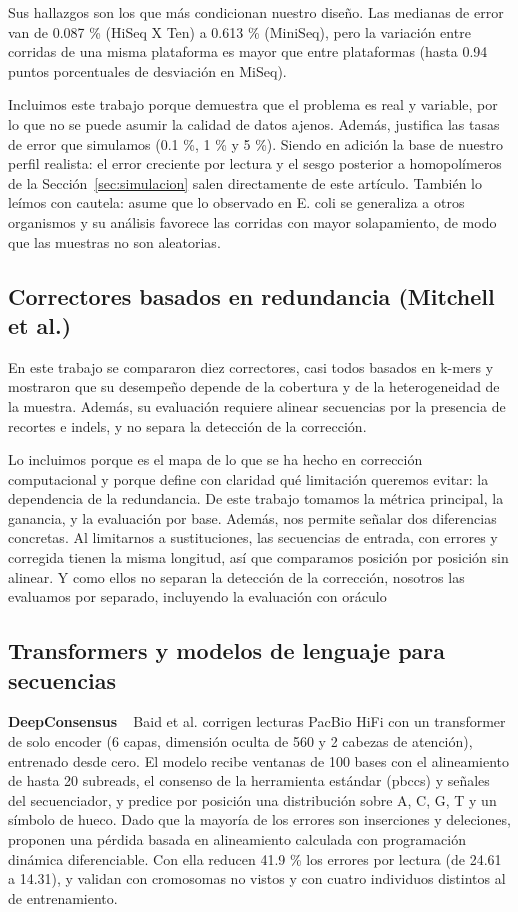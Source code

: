 \documentclass[sigconf,nonacm]{acmart}
\begin{document}
Sus hallazgos son los que más condicionan nuestro diseño. Las medianas de error van de 0.087 \% (HiSeq X Ten) a 0.613 \% (MiniSeq), pero la variación entre corridas de una misma plataforma es mayor que entre plataformas (hasta 0.94 puntos porcentuales de desviación en MiSeq).

Incluimos este trabajo porque demuestra que el problema es real y variable, por lo que no se puede asumir la calidad de datos ajenos. Además, justifica las tasas de error que simulamos (0.1 \%, 1 \% y 5 \%). Siendo en adición la base de nuestro perfil realista: el error creciente por lectura y el sesgo posterior a homopolímeros de la Sección~\ref{sec:simulacion} salen directamente de este artículo. También lo leímos con cautela: asume que lo observado en E. coli se generaliza a otros organismos y su análisis favorece las corridas con mayor solapamiento, de modo que las muestras no son aleatorias.

\subsection{\texorpdfstring{Correctores basados en redundancia (Mitchell et al.)~\cite{mitchell2020benchmarking}}{Correctores basados en redundancia (Mitchell et al.)}}

En este trabajo se compararon diez correctores, casi todos basados en k-mers y mostraron que su desempeño depende de la cobertura y de la heterogeneidad de la muestra. Además, su evaluación requiere alinear secuencias por la presencia de recortes e indels, y no separa la detección de la corrección.

Lo incluimos porque es el mapa de lo que se ha hecho en corrección computacional y porque define con claridad qué limitación queremos evitar: la dependencia de la redundancia. De este trabajo tomamos la métrica principal, la ganancia, y la evaluación por base. Además, nos permite señalar dos diferencias concretas. Al limitarnos a sustituciones, las secuencias de entrada, con errores y corregida tienen la misma longitud, así que comparamos posición por posición sin alinear. Y como ellos no separan la detección de la corrección, nosotros las evaluamos por separado, incluyendo la evaluación con oráculo

\subsection{Transformers y modelos de lenguaje para secuencias}

\textbf{DeepConsensus} ~\cite{baid2021deepconsensus} Baid et al. corrigen lecturas PacBio HiFi con un transformer de solo encoder (6 capas, dimensión oculta de 560 y 2 cabezas de atención), entrenado desde cero. El modelo recibe ventanas de 100 bases con el alineamiento de hasta 20 subreads, el consenso de la herramienta estándar (pbccs) y señales del secuenciador, y predice por posición una distribución sobre A, C, G, T y un símbolo de hueco. Dado que la mayoría de los errores son inserciones y deleciones, proponen una pérdida basada en alineamiento calculada con programación dinámica diferenciable. Con ella reducen 41.9 \% los errores por lectura (de 24.61 a 14.31), y validan con cromosomas no vistos y con cuatro individuos distintos al de entrenamiento.
\end{document}
